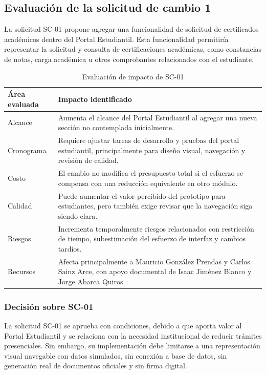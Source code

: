 \documentclass[11pt,spanish]{article}
\begin{document}
\subsection{Evaluación de la solicitud de cambio 1}

La solicitud SC-01 propone agregar una funcionalidad de solicitud de certificados académicos dentro del Portal Estudiantil. Esta funcionalidad permitiría representar la solicitud y consulta de certificaciones académicas, como constancias de notas, carga académica u otros comprobantes relacionados con el estudiante.

\begin{table}[H]
\centering
\caption{Evaluación de impacto de SC-01}
\label{tab:evaluacion-sc01}
{\small
\begin{tabularx}{\textwidth}{p{3.2cm} Y}
\toprule
\textbf{Área evaluada} & \textbf{Impacto identificado} \\
\midrule
Alcance & Aumenta el alcance del Portal Estudiantil al agregar una nueva sección no contemplada inicialmente. \\
Cronograma & Requiere ajustar tareas de desarrollo y pruebas del portal estudiantil, principalmente para diseño visual, navegación y revisión de calidad. \\
Costo & El cambio no modifica el presupuesto total si el esfuerzo se compensa con una reducción equivalente en otro módulo. \\
Calidad & Puede aumentar el valor percibido del prototipo para estudiantes, pero también exige revisar que la navegación siga siendo clara. \\
Riesgos & Incrementa temporalmente riesgos relacionados con restricción de tiempo, subestimación del esfuerzo de interfaz y cambios tardíos. \\
Recursos & Afecta principalmente a Mauricio González Prendas y Carlos Sainz Arce, con apoyo documental de Isaac Jiménez Blanco y Jorge Abarca Quiros. \\
\bottomrule
\end{tabularx}
}
\end{table}

\subsubsection{Decisión sobre SC-01}

La solicitud SC-01 se aprueba con condiciones, debido a que aporta valor al Portal Estudiantil y se relaciona con la necesidad institucional de reducir trámites presenciales. Sin embargo, su implementación debe limitarse a una representación visual navegable con datos simulados, sin conexión a base de datos, sin generación real de documentos oficiales y sin firma digital.
\end{document}
